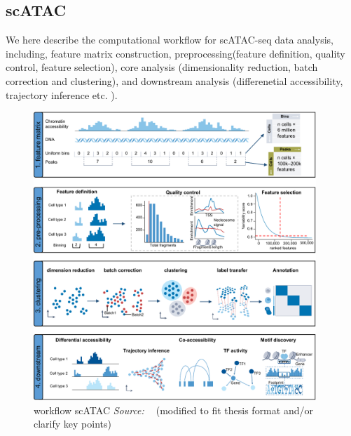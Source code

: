 \subsection{scATAC}
We here describe the computational workflow for scATAC-seq data analysis, including, feature matrix construction, preprocessing(feature definition, quality control,  feature selection), core analysis (dimensionality reduction, batch correction and clustering), and downstream analysis (differenetial accessibility, trajectory inference etc. ).
\begin{figure}[!ht]
	\centering
	\includegraphics[width=0.95\textwidth]{workflow_scATAC/fig}
	\vspace{0.1cm}
	\caption[workflow\_scATAC.]{workflow scATAC  \emph{Source: ~\cite{heumos2023best}} (modified to fit thesis format and/or clarify key points)}
	\label{fig:workflow_scATAC}
\end{figure}


